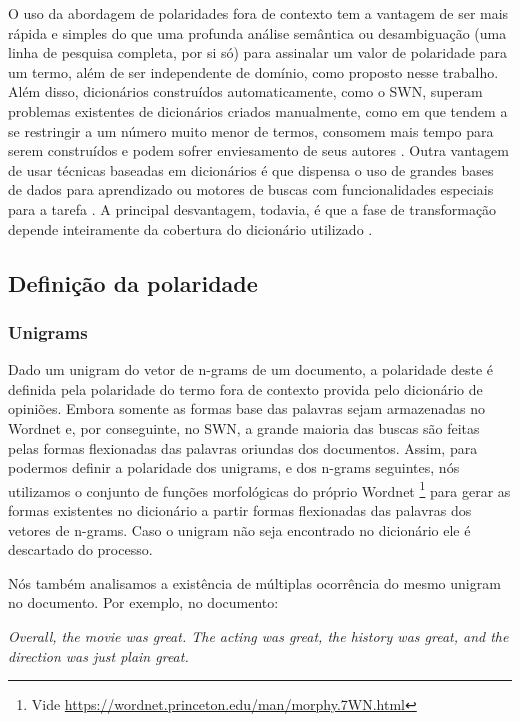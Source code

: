 O uso da abordagem de polaridades fora de contexto tem a vantagem de ser mais rápida e simples do que uma profunda análise semântica ou desambiguação (uma linha de pesquisa completa, por si só) para assinalar um valor de polaridade para um termo, além de ser independente de domínio, como proposto nesse trabalho. Além disso, dicionários construídos automaticamente, como o SWN, superam problemas existentes de dicionários criados manualmente, como em \cite{taboada2008extracting, taboada2011lexicon} que tendem a se restringir a um número muito menor de termos, consomem mais tempo para serem construídos e podem sofrer enviesamento de seus autores \cite{ohana2009sentiment}. Outra vantagem de usar técnicas baseadas em dicionários é que dispensa o uso de grandes bases de dados para aprendizado ou motores de buscas com funcionalidades especiais para a tarefa \cite{khan2011sentiment}. A principal desvantagem, todavia, é que a fase de  transformação depende inteiramente da cobertura do dicionário utilizado \cite{khan2011sentiment}. 

\subsection{Definição da polaridade}

\subsubsection{Unigrams}

Dado um unigram do vetor de n-grams de um documento, a polaridade deste é definida pela polaridade do termo fora de contexto provida pelo dicionário de opiniões. Embora somente as formas base das palavras sejam armazenadas no Wordnet e, por conseguinte, no SWN, a grande maioria das buscas são feitas pelas formas flexionadas das palavras oriundas dos documentos. Assim, para podermos definir a polaridade dos unigrams, e dos n-grams seguintes, nós utilizamos o conjunto de funções morfológicas do próprio Wordnet \footnote{Vide \url{https://wordnet.princeton.edu/man/morphy.7WN.html}} para gerar as formas existentes no dicionário a partir formas flexionadas das palavras dos vetores de n-grams. Caso o unigram não seja encontrado no dicionário ele é descartado do processo.

Nós também analisamos a existência de múltiplas ocorrência do mesmo unigram no documento. Por exemplo, no documento:

\textit{Overall, the movie was great. The acting was great, the history was great, and the direction was just plain great.}

